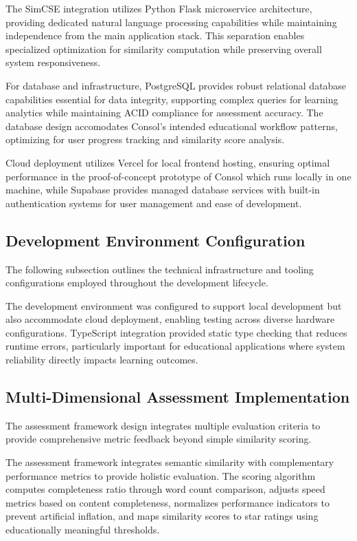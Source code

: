 {{The SimCSE integration utilizes Python Flask microservice architecture, providing dedicated natural language processing capabilities while maintaining independence from the main application stack. This separation enables specialized optimization for similarity computation while preserving overall system responsiveness.

For database and infrastructure, PostgreSQL provides robust relational database capabilities essential for data integrity, supporting complex queries for learning analytics while maintaining ACID compliance for assessment accuracy. The database design accomodates Consol's intended educational workflow patterns, optimizing for user progress tracking and similarity score analysis.

Cloud deployment utilizes Vercel for local frontend hosting, ensuring optimal performance in the proof-of-concept prototype of Consol which runs locally in one machine, while Supabase provides managed database services with built-in authentication systems for user management and ease of development.}

\subsection{Development Environment Configuration}

The following subsection outlines the technical infrastructure and tooling configurations employed throughout the development lifecycle.

The development environment was configured to support local development but also accommodate cloud deployment, enabling testing across diverse hardware configurations. TypeScript integration provided static type checking that reduces runtime errors, particularly important for educational applications where system reliability directly impacts learning outcomes.


\subsection{Multi-Dimensional Assessment Implementation}

The assessment framework design integrates multiple evaluation criteria to provide comprehensive metric feedback beyond simple similarity scoring.

The assessment framework integrates semantic similarity with complementary performance metrics to provide holistic evaluation. The scoring algorithm computes completeness ratio through word count comparison, adjusts speed metrics based on content completeness, normalizes performance indicators to prevent artificial inflation, and maps similarity scores to star ratings using educationally meaningful thresholds.

}
